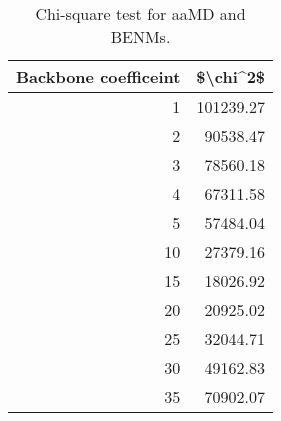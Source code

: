 \begin{table}[center]
\centering
\caption{Chi-square test for aaMD and BENMs.}
\label{tab:chi2}
\begin{tabular}{rr}
\toprule
Backbone coefficeint &  \$\textbackslash chi\textasciicircum 2\$ \\
\midrule
                   1 & 101239.27 \\
                   2 &  90538.47 \\
                   3 &  78560.18 \\
                   4 &  67311.58 \\
                   5 &  57484.04 \\
                  10 &  27379.16 \\
                  15 &  18026.92 \\
                  20 &  20925.02 \\
                  25 &  32044.71 \\
                  30 &  49162.83 \\
                  35 &  70902.07 \\
\bottomrule
\end{tabular}
\end{table}
